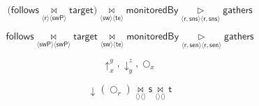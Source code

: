 \documentclass[a4paper,10pt]{article}
\newcommand{\tuple}[1]{\langle #1 \rangle}
\newcommand{\joinsymbol}{\bowtie}
\newcommand{\antijoinsymbol}{\, \triangleright \,}
\newcommand{\join}[2]{\!\underset{\tuple{\mathsf{#1}} \tuple{\mathsf{#2}}}{\joinsymbol}\!}
\newcommand{\antijoin}[2]{\!\underset{\tuple{\mathsf{#1}} \tuple{\mathsf{#2}}}{\antijoinsymbol}\!}
\newcommand{\expandout}[2]{\uparrow_{#1}^{#2}}
\newcommand{\expandin}[2]{\downarrow_{#1}^{#2}}
\newcommand{\getnodes}[1]{\bigcirc_{#1}}
\newcommand{\relation}[1]{\mathsf{#1}}
\begin{document}

$$\Big(\relation{follows} \join{r}{swP} \relation{target}\Big) \join{sw}{te} \relation{monitoredBy} \antijoin{\relation{r,sns}}{\relation{r,sns}} \relation{gathers}$$

$$\relation{follows} \join{swP}{swP} \relation{target} \join{sw}{te} \relation{monitoredBy} \antijoin{r,sen}{r,sen} \relation{gathers}$$

$$\expandout{x}{y}, \expandin{y}{z}, \getnodes{x}$$

$$\expandin{}{} \left(\getnodes{r}\right)
\join{}{}
\relation{s}
\join{}{}
\relation{t}
$$
\end{document}

